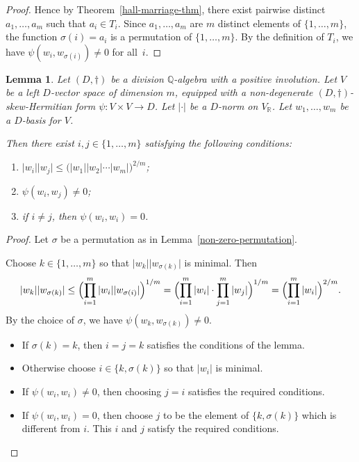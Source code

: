 \documentclass[11pt]{article}
\numberwithin{equation}{section}
\newenvironment{enumeratei}
{\bgroup\def\theenumi{\roman{enumi}}\def\theenumii{\alph{enumii}}\begin{enumerate}}
{\end{enumerate}\egroup}
\newcommand{\bQ}{\mathbb{Q}}
\newcommand{\bR}{\mathbb{R}}
\newcommand{\abs}[1]{\lvert #1 \rvert}
\newtheorem{lemma}{Lemma}[section]
\begin{document}
\begin{proof}
Hence by Theorem~\ref{hall-marriage-thm}, there exist pairwise distinct $a_1, \dotsc, a_m$ such that $a_i \in T_i$. Since $a_1, \dotsc, a_m$ are $m$ distinct elements of $\{1, \dotsc, m \}$, the function $\sigma(i) = a_i$ is a permutation of $\{ 1, \dotsc, m \}$.
By the definition of $T_i$, we have $\psi(w_i, w_{\sigma(i)}) \neq 0$ for all~$i$.
\end{proof}

\begin{lemma} \label{short-non-degenerate-vectors}
Let $(D,\dag)$ be a division $\bQ$-algebra with a positive involution.
Let $V$ be a left $D$-vector space of dimension $m$, equipped with a non-degenerate $(D,\dag)$-skew-Hermitian form $\psi \colon V \times V \to D$.
Let $\abs{\cdot}$ be a $D$-norm on $V_\bR$.
Let $w_1, \dotsc, w_m$ be a $D$-basis for $V$.

Then there exist $i,j \in \{ 1, \dotsc, m \}$ satisfying the following conditions:
\begin{enumeratei}
\item $\abs{w_i}\abs{w_j} \leq \bigl( \abs{w_1} \abs{w_2} \dotsm \abs{w_m} \bigr)^{2/m}$;
\item $\psi(w_i, w_j) \neq 0$;
\item if $i \neq j$, then $\psi(w_i,w_i) = 0$.
\end{enumeratei}
\end{lemma}

\begin{proof}
Let $\sigma$ be a permutation as in Lemma~\ref{non-zero-permutation}.

Choose $k \in \{ 1, \dotsc, m \}$ so that $\abs{w_k} \abs{w_{\sigma(k)}}$ is minimal.
Then
\[
\abs{w_k} \abs{w_{\sigma(k)}}
\leq \Bigl( \prod_{i=1}^m\, \abs{w_i} \abs{w_{\sigma(i)}} \Bigr)^{1/m}
= \Bigl( \prod_{i=1}^m\, \abs{w_i} \cdot \prod_{j=1}^m\, \abs{w_j} \Bigr)^{1/m}
= \Bigl( \prod_{i=1}^m\, \abs{w_i} \Bigr)^{2/m}.
\]
By the choice of $\sigma$, we have $\psi(w_k, w_{\sigma(k)}) \neq 0$.

\begin{itemize}
\item
If $\sigma(k) = k$, then $i=j=k$ satisfies the conditions of the lemma.

\item
Otherwise choose $i \in \{ k, \sigma(k) \}$ so that $\abs{w_i}$ is minimal.

\item
If $\psi(w_i, w_i) \neq 0$, then choosing $j=i$ satisfies the required conditions.

\item
If $\psi(w_i, w_i) = 0$, then choose $j$ to be the element of $\{ k, \sigma(k) \}$ which is different from $i$.
This $i$ and $j$ satisfy the required conditions.\qedhere
\end{itemize}
\end{proof}
\end{document}
